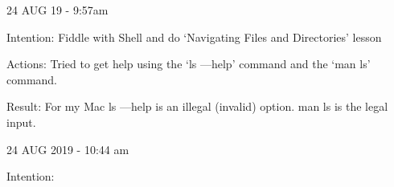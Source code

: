 24 AUG 19 - 9:57am

Intention: Fiddle with Shell and do ‘Navigating Files and Directories’ lesson

Actions: Tried to get help using the ‘ls —help’ command and the ‘man ls’ command.

Result: For my Mac ls —help is an illegal (invalid) option. man ls is the legal input.


24 AUG 2019 - 10:44 am

Intention: 